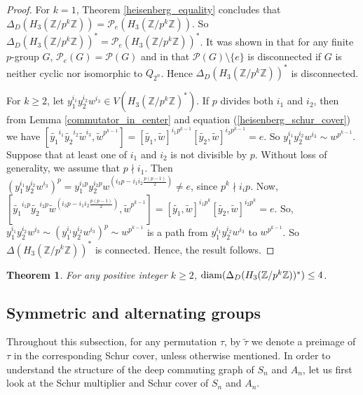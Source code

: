 \documentclass[12pt,a4paper]{article}
\newtheorem{theorem}{Theorem}[section]
\begin{document}
\begin{proof}
For $k=1$, Theorem \ref{heisenberg_equality} concludes that $\Delta_D(H_3(\mathbb{Z}/p^k\mathbb{Z}))=\mathcal{P}_e(H_3(\mathbb{Z}/p^k\mathbb{Z}))$. So $\Delta_D(H_3(\mathbb{Z}/p^k\mathbb{Z}))^*=\mathcal{P}_e(H_3(\mathbb{Z}/p^k\mathbb{Z}))^*$. It was shown in \cite[Theorem 28]{aa} that for any finite $p$-group $G$, $\mathcal{P}_e(G)=\mathcal{P}(G)$  and in \cite[Corollary 4.1]{moga} that $\mathcal{P}(G)\setminus\{e\}$ is disconnected if $G$ is neither cyclic nor isomorphic to $Q_{2^n}$. Hence $\Delta_D(H_3(\mathbb{Z}/p^k\mathbb{Z}))^*$ is disconnected.

For $k\geq 2$, let $y_1^{i_1}y_2^{i_2}w^{i_3}\in V(H_3(\mathbb{Z}/p^k\mathbb{Z})^*)$. If $p$ divides both $i_1$ and $i_2$, then from Lemma \ref{commutator_in_center} and equation (\ref{heisenberg_schur_cover}) we have $[\tilde{y_1}^{i_1}\tilde{y_2}^{i_2}\tilde{w}^{i_3},\tilde{w}^{p^{k-1}}]=[\tilde{y_1},\tilde{w}]^{i_1p^{k-1}}[\tilde{y_2},\tilde{w}]^{i_2p^{k-1}}=e$. So $y_1^{i_1}y_2^{i_2}w^{i_3}\sim w^{p^{k-1}}$. Suppose that at least one of $i_1$ and $i_2$ is not divisible by $p$. Without loss of generality, we assume that $p\nmid i_1$. Then $(y_1^{i_1}y_2^{i_2}w^{i_3})^p=y_1^{i_1p}y_2^{i_2p}w^{(i_3p-i_1i_2\frac{p(p-1)}{2})}\neq e$, since $p^k\nmid i_ip$. Now, $[\tilde{y_1}^{i_1p}\tilde{y_2}^{i_2p}\tilde{w}^{({i_3p-i_1i_2\frac{p(p-1)}{2}})},\tilde{w}^{p^{k-1}}]=[\tilde{y_1},\tilde{w}]^{i_1p^k}[\tilde{y_2},\tilde{w}]^{i_2p^k}=e$. So, $y_1^{i_1}y_2^{i_2}w^{i_3}\sim (y_1^{i_1}y_2^{i_2}w^{i_3})^p\sim w^{p^{k-1}}$ is a path from $y_1^{i_1}y_2^{i_2}w^{i_3}$ to $w^{p^{k-1}}$. So $\Delta(H_3(\mathbb{Z}/p^k\mathbb{Z}))^*$ is connected. Hence, the result follows.
\end{proof}

\begin{theorem}\label{diameter_heisenberg}
For any positive integer $k\geq 2$, ${\rm diam}(\Delta_D(H_3(\mathbb{Z}/p^k\mathbb{Z}))^*)\leq 4$.    
\end{theorem}

\subsection{Symmetric and alternating groups}\label{Deep commuting graph of symmetric and alternating groups}

Throughout this subsection, for any permutation $\tau$, by $\tilde{\tau}$ we denote a preimage of $\tau$ in the corresponding Schur cover, unless otherwise mentioned. In order to understand the structure of the deep commuting graph of $S_n$ and $A_n$, let us first look at the Schur multiplier and Schur cover of $S_n$ and $A_n$. 
\end{document}
